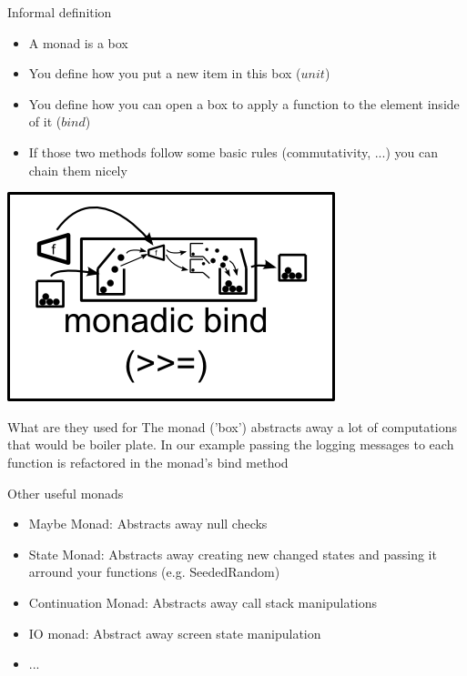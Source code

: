 \begin{frame}[fragile]{Informal definition}
    \begin{block}{}
        \begin{itemize}
            \item A monad is a box
            \item You define how you put a new item in this box ($unit$)
            \item You define how you can open a box to apply a function to the element inside of it ($bind$)
            \item If those two methods follow some basic rules (commutativity, ...) you can chain them nicely
        \end{itemize}
        \begin{center}
            \includegraphics[scale=0.25]{images/monadic-bind}
        \end{center}
    \end{block}
\end{frame}

\begin{frame}[fragile]{}
    \begin{block}{What are they used for}
        The monad ('box') abstracts away a lot of computations that would be boiler plate.
        In our example passing the logging messages to each function is refactored in the monad's bind method
    \end{block}
\end{frame}

\begin{frame}[t]{}
    \begin{block}{Other useful monads}
        \begin{itemize}
            \item Maybe Monad: Abstracts away null checks
            \item State Monad: Abstracts away creating new changed states and passing it arround your functions (e.g.  SeededRandom)
            \item Continuation Monad: Abstracts away call stack manipulations
            \item IO monad: Abstract away screen state manipulation
            \item ...
        \end{itemize}
    \end{block}
\end{frame}

